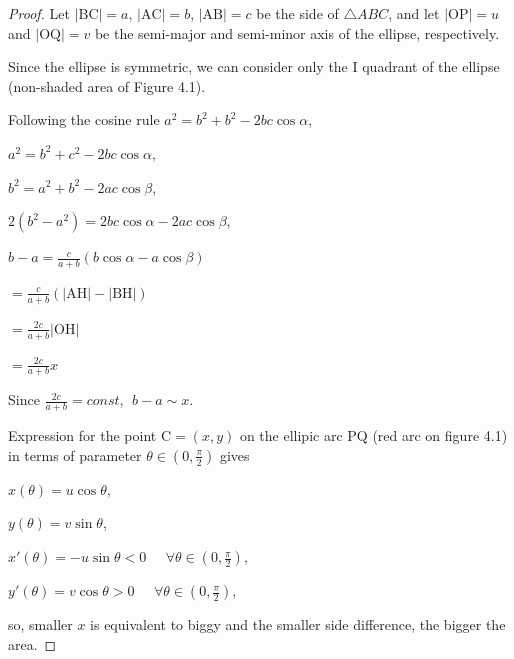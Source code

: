 \documentclass[a4paper]{book}
\numberwithin{theorem}{section}%
\begin{document}
\begin{proof} 
    Let $|\mathrm{BC}|=a$, $|\mathrm{AC}|=b$, $|\mathrm{AB}|=c$ be the side of $\triangle ABC$, and let $|\mathrm{OP}|=u$ and $|\mathrm{OQ}|=v$ be the semi-major and semi-minor axis of the ellipse, respectively.

    Since the ellipse is symmetric, we can consider only the I quadrant of the ellipse (non-shaded area of Figure 4.1).

    Following the cosine rule $a^{2}=b^{2}+b^{2}-2bc\cos{\alpha}$,
    \begin{center}
        $\displaystyle a^{2}=b^{2}+c^{2}-2bc\cos{\alpha}$,

        $\displaystyle b^{2}=a^{2}+b^{2}-2ac\cos{\beta}$,

        $\displaystyle 2(b^{2}-a^{2})=2bc\cos{\alpha}-2ac\cos{\beta}$,

        $\displaystyle b-a=\frac{c}{a+b}(b\cos{\alpha}-a\cos{\beta})$

        $\displaystyle =\frac{c}{a+b}(|\mathrm{AH}|-|\mathrm{BH}|)$

        $\displaystyle =\frac{2c}{a+b}|\mathrm{OH}|$

        $\displaystyle =\frac{2c}{a+b}x$

        Since $\displaystyle \frac{2c}{a+b}=const$, $\displaystyle \;b-a\sim x$.
    \end{center}
    Expression for the point $\mathrm{C}=(x,y)$ on the ellipic arc $\mathrm{PQ}$ (red arc on figure 4.1) in terms of parameter $\displaystyle \theta\in(0,\frac{\pi}{2})$ gives
    \begin{center}
        $\displaystyle x(\theta)=u\cos{\theta}$,

        $\displaystyle y(\theta)=v\sin{\theta}$,

        $\displaystyle x'(\theta)=-u\sin{\theta}<0\;\;\;\;\;\forall\theta\in(0,\frac{\pi}{2})$,

        $\displaystyle y'(\theta)=v\cos{\theta}>0\;\;\;\;\;\forall\theta\in(0,\frac{\pi}{2})$,
    \end{center}
    so, smaller $x$ is equivalent to biggy and the smaller side difference, the bigger the area.
\end{proof}
\end{document}
